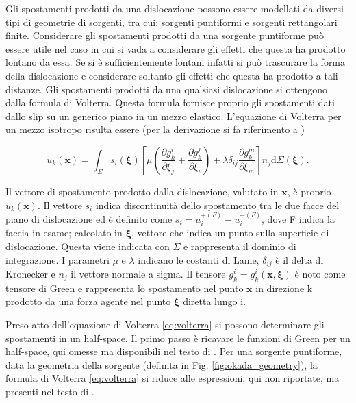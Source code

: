 Gli spostamenti prodotti da una dislocazione possono essere modellati da diversi tipi di geometrie di sorgenti, tra cui: sorgenti puntiformi e sorgenti rettangolari finite. Considerare gli spostamenti prodotti da una sorgente puntiforme può essere utile nel caso in cui si vada a considerare gli effetti che questa ha prodotto lontano da essa. Se si è sufficientemente lontani infatti si può trascurare la forma della dislocazione e considerare soltanto gli effetti che questa ha prodotto a tali distanze.
Gli spostamenti prodotti da una qualsiasi dislocazione si ottengono dalla formula di Volterra. Questa formula fornisce proprio gli spostamenti dati dallo slip su un generico piano in un mezzo elastico.
L'equazione di Volterra per un mezzo isotropo risulta essere (per la derivazione si fa riferimento a \citet{segall2010})

\begin{equation}
    \label{eq:volterra}
    u_k(\mathbf{x}) = \int_{\Sigma} s_i(\bm{\xi}) \left[ \mu \left( \frac{\partial g_k^i}{\partial \xi_j} + \frac{\partial g_k^j}{\partial \xi_i} \right) + \lambda\delta_{ij} \frac{\partial g_k^m}{\partial \xi_m} \right] n_j \text{d} \Sigma(\bm{\xi}).
\end{equation}

Il vettore di spostamento prodotto dalla dislocazione, valutato in \(\mathbf{x}\), è proprio \(u_k(\mathbf{x})\). Il vettore \(s_i\) indica discontinuità dello spostamento tra le due facce del piano di dislocazione ed è definito come \(s_i = u_i^{+(F)}-u_i^{-(F)}\), dove F indica la faccia in esame; calcolato in \(\bm{\xi}\), vettore che indica un punto sulla superficie di dislocazione. Questa viene indicata con \(\Sigma\) e rappresenta il dominio di integrazione. I parametri \(\mu\) e \(\lambda\) indicano le costanti di Lame, \(\delta_{ij}\) è il delta di Kronecker e \(n_j\) il vettore normale a sigma. Il tensore \(g_k^i = g_k^i(\mathbf{x}, \bm{\xi})\) è noto come tensore di Green e rappresenta lo spostamento nel punto \(\mathbf{x}\) in direzione k prodotto da una forza agente nel punto \(\bm{\xi}\) diretta lungo i.

Preso atto dell'equazione di Volterra \eqref{eq:volterra} si possono determinare gli spostamenti in un half-space. Il primo passo è ricavare le funzioni di Green per un half-space, qui omesse ma disponibili nel testo di \citet{segall2010}.
Per una sorgente puntiforme, data la geometria della sorgente (definita in Fig. \ref{fig:okada_geometry}), la formula di Volterra \eqref{eq:volterra} si riduce alle espressioni, qui non riportate, ma presenti nel testo di \citet{segall2010}.



